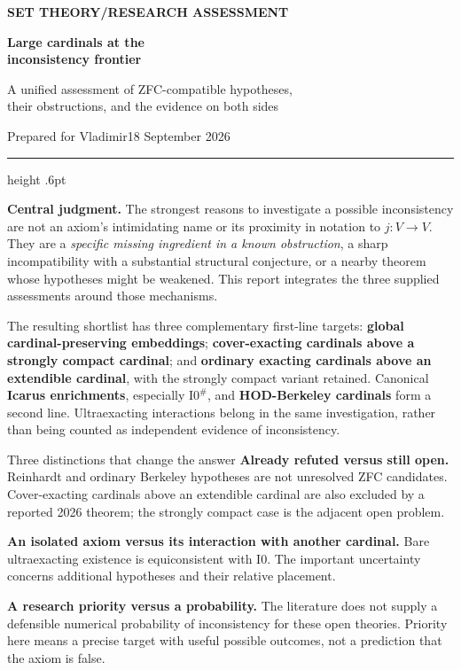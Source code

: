 \documentclass[11pt,letterpaper]{article}
\theoremstyle{definition}
\newcommand{\Izero}{\mathrm{I0}}
\newcommand{\Isharp}{\mathrm{I0}^{\#}}
\begin{document}
\thispagestyle{empty}
{\sffamily\bfseries\small\color{Olive}SET THEORY\quad /\quad RESEARCH ASSESSMENT}

\vspace{13pt}
{\fontsize{28}{31}\selectfont\bfseries\color{Forest}Large cardinals at the\\ inconsistency frontier\par}
\vspace{10pt}
{\fontsize{14}{18}\selectfont A unified assessment of ZFC-compatible hypotheses,\\ their obstructions, and the evidence on both sides\par}
\vspace{14pt}
{\color{Muted}Prepared for Vladimir\hfill 18 September 2026\par}
\vspace{3pt}
{\color{Sage}\hrule height .6pt}
\vspace{12pt}

\textbf{Central judgment.} The strongest reasons to investigate a possible inconsistency are not an axiom's intimidating name or its proximity in notation to $j:V\to V$. They are a \emph{specific missing ingredient in a known obstruction}, a sharp incompatibility with a substantial structural conjecture, or a nearby theorem whose hypotheses might be weakened. This report integrates the three supplied assessments around those mechanisms.

The resulting shortlist has three complementary first-line targets: \textbf{global cardinal-preserving embeddings}; \textbf{cover-exacting cardinals above a strongly compact cardinal}; and \textbf{ordinary exacting cardinals above an extendible cardinal}, with the strongly compact variant retained. Canonical \textbf{Icarus enrichments}, especially $\Isharp$, and \textbf{HOD-Berkeley cardinals} form a second line. Ultraexacting interactions belong in the same investigation, rather than being counted as independent evidence of inconsistency.

\begin{assessment}{Three distinctions that change the answer}
\textbf{Already refuted versus still open.} Reinhardt and ordinary Berkeley hypotheses are not unresolved ZFC candidates. Cover-exacting cardinals above an extendible cardinal are also excluded by a reported 2026 theorem; the strongly compact case is the adjacent open problem.

\textbf{An isolated axiom versus its interaction with another cardinal.} Bare ultraexacting existence is equiconsistent with $\Izero$. The important uncertainty concerns additional hypotheses and their relative placement.

\textbf{A research priority versus a probability.} The literature does not supply a defensible numerical probability of inconsistency for these open theories. Priority here means a precise target with useful possible outcomes, not a prediction that the axiom is false.
\end{assessment}
\end{document}

